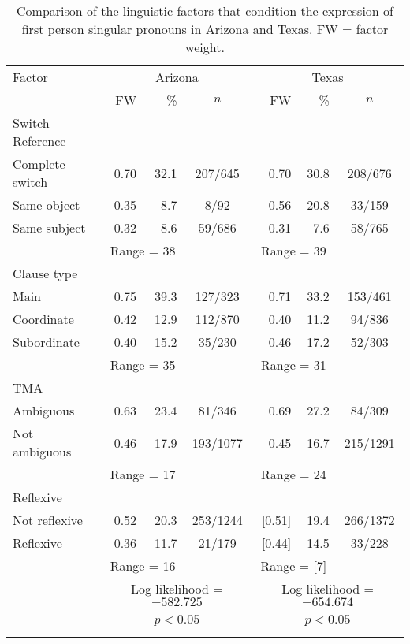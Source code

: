 \documentclass[output=paper]{langscibook}
\begin{document}
	\begin{table}
	\begin{tabular}{l rrc rrc}
		\lsptoprule
		{Factor} & \multicolumn{3}{c}{{Arizona}}  & \multicolumn{3}{c}{{Texas}}\\
		\cmidrule(lr){2-4}\cmidrule(lr){5-7}
		   & {FW} & {\%} & {$n$} &  {FW} & {\%} & {$n$}\\\midrule
        {Switch Reference} \\
		{Complete switch} & {0.70} & {32.1} & {207/645} &  {0.70} & {30.8} & {208/676}\\
		{Same object} & {0.35} & {8.7} & {8/92} &  {0.56} & {20.8} & {33/159}\\
		{Same subject} & {0.32} & {8.6} & {59/686} &  {0.31} & {7.6} & {58/765}\\
		& \multicolumn{2}{c}{{Range = 38}} &   & \multicolumn{2}{c}{{Range = 39}} & \\
		
		{Clause type}\\
		{Main} & {0.75} & {39.3} & {127/323} & {0.71} & {33.2} & {153/461}\\
		{Coordinate} & {0.42} & {12.9} & {112/870} & {0.40} & {11.2} & {94/836}\\
		{Subordinate} & {0.40} & {15.2} & {35/230} & {0.46} & {17.2} & {52/303}\\
		& \multicolumn{2}{c}{{Range = 35}} &  & \multicolumn{2}{c}{{Range = 31}} & \\
		
		{TMA}\\
		{Ambiguous} & {0.63} & {23.4} & {81/346} & {0.69} & {27.2} & {84/309}\\
		{Not ambiguous} & {0.46} & {17.9} & {193/1077} &{0.45} & {16.7} & {215/1291}\\
		& \multicolumn{2}{c}{{Range = 17}} &  & \multicolumn{2}{c}{{Range = 24}} & \\
		
		{Reflexive}\\
		{Not reflexive} & {0.52} & {20.3} & {253/1244} & {[0.51]} & {19.4} & {266/1372}\\
		{Reflexive} & {0.36} & {11.7} & {21/179} & {[0.44]} & {14.5} & {33/228}\\
		& \multicolumn{2}{c}{{Range = 16}} &  & \multicolumn{2}{c}{{Range = [7]}} & \\\tablevspace
		
		& \multicolumn{3}{c}{{Log likelihood = $-582.725$}} & \multicolumn{3}{c}{{Log likelihood = $-654.674$}}\\
		{~} & \multicolumn{3}{c}{{$p < 0.05$}} &  \multicolumn{3}{c}{{$p < 0.05$}}\\
		\lspbottomrule
	\end{tabular}
	\caption{Comparison of the linguistic factors that condition the expression of first person singular pronouns in Arizona and Texas. FW = factor weight.\label{tab:aztx:5}}
\end{table}
\end{document}
